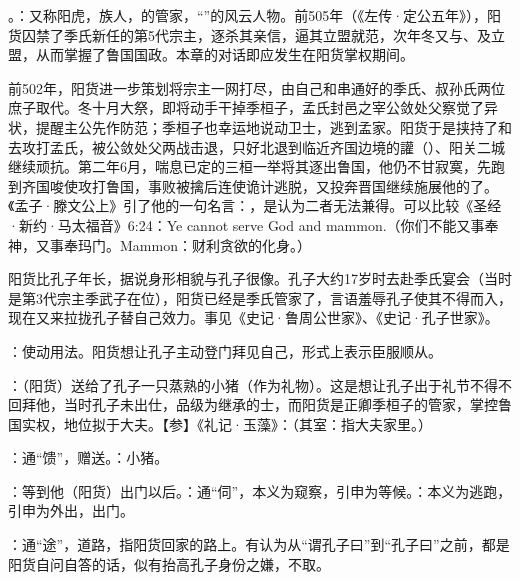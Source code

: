 {
\item {}。：又称阳虎，族人，的管家，“”的风云人物。前505年（《左传·定公五年》），阳货囚禁了季氏新任的第5代宗主，逐杀其亲信，逼其立盟就范，次年冬又与、及立盟，从而掌握了鲁国国政。本章的对话即应发生在阳货掌权期间。

前502年，阳货进一步策划将宗主一网打尽，由自己和串通好的季氏、叔孙氏两位庶子取代。冬十月大祭，即将动手干掉季桓子，孟氏封邑之宰公敛处父察觉了异状，提醒主公先作防范；季桓子也幸运地说动卫士，逃到孟家。阳货于是挟持了和去攻打孟氏，被公敛处父两战击退，只好北退到临近齐国边境的讙（）、阳关二城继续顽抗。第二年6月，喘息已定的三桓一举将其逐出鲁国，他仍不甘寂寞，先跑到齐国唆使攻打鲁国，事败被擒后连使诡计逃脱，又投奔晋国继续施展他的了。《孟子·滕文公上》引了他的一句名言：，是认为二者无法兼得。可以比较《圣经·新约·马太福音》6:24：Ye cannot serve God and mammon.（你们不能又事奉神，又事奉玛门。Mammon：财利贪欲的化身。）

阳货比孔子年长，据说身形相貌与孔子很像。孔子大约17岁时去赴季氏宴会（当时是第3代宗主季武子在位），阳货已经是季氏管家了，言语羞辱孔子使其不得而入，现在又来拉拢孔子替自己效力。事见《史记·鲁周公世家》、《史记·孔子世家》。

：使动用法。阳货想让孔子主动登门拜见自己，形式上表示臣服顺从。

\item {}：（阳货）送给了孔子一只蒸熟的小猪（作为礼物）。这是想让孔子出于礼节不得不回拜他，当时孔子未出仕，品级为继承的士，而阳货是正卿季桓子的管家，掌控鲁国实权，地位拟于大夫。【参】《礼记·玉藻》：（其室：指大夫家里。）

：通“馈”，赠送。：小猪。
\item {}：等到他（阳货）出门以后。：通“伺”，本义为窥察，引申为等候。：本义为逃跑，引申为外出，出门。

\item {}：通“途”，道路，指阳货回家的路上。有认为从“谓孔子曰”到“孔子曰”之前，都是阳货自问自答的话，似有抬高孔子身份之嫌，不取。

}
